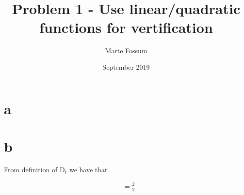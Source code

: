 \documentclass[12pt, a4paper]{article}
\title{Problem 1 - Use linear/quadratic functions for vertification}
\date{September 2019}
\author{Marte Fossum}
\begin{document}
\maketitle
    
\section*{a}

\section*{b}

From definition of $\text{D}_{\text{t}}$ we have that

\begin{align}
	[D_t D_t t] &= \frac{2}{2}
\end{align}
\end{document}
